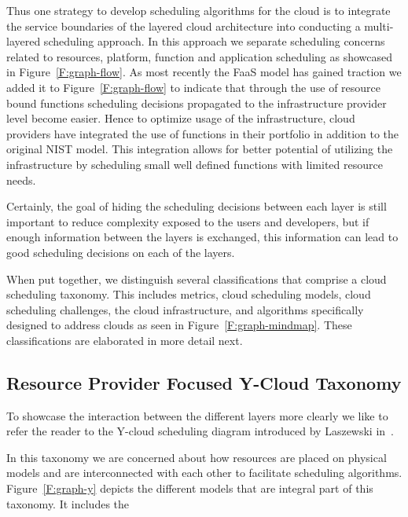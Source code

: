 \documentclass[final,5p,times,twocolumn]{elsarticle}
\begin{document}
Thus one strategy to develop scheduling algorithms for the cloud is to
integrate the service boundaries of the layered cloud architecture
into conducting a multi-layered scheduling approach. In this approach
we separate scheduling concerns related to resources, platform,
function and application scheduling as showcased in
Figure~\ref{F:graph-flow}.  As most recently the FaaS model has gained
traction we added it to Figure~\ref{F:graph-flow} to indicate that
through the use of resource bound functions scheduling decisions
propagated to the infrastructure provider level become easier.  Hence
to optimize usage of the infrastructure, cloud providers have
integrated the use of functions in their portfolio in addition to the
original NIST model.  This integration allows for better potential of
utilizing the infrastructure by scheduling small well defined
functions with limited resource needs.

Certainly, the goal of hiding the scheduling decisions between each
layer is still important to reduce complexity exposed to the users and
developers, but if enough information between the layers is exchanged,
this information can lead to good scheduling decisions on each of the
layers.

When put together, we distinguish several classifications that
comprise a cloud scheduling taxonomy. This includes
metrics, cloud scheduling models, cloud scheduling challenges, the
cloud infrastructure, and algorithms specifically designed to address
clouds as seen in Figure~\ref{F:graph-mindmap}.  These classifications are
elaborated in more detail next.



\subsection{Resource Provider Focused Y-Cloud Taxonomy}\label{sec:y}

To showcase the interaction between the different layers more clearly
we like to refer the reader to the Y-cloud scheduling diagram
introduced by Laszewski in~\cite{lasbook}.

In this taxonomy we are concerned about how resources are placed on
physical models and are interconnected with each other to facilitate
scheduling algorithms. Figure~\ref{F:graph-y} depicts the different
models that are integral part of this taxonomy. It includes the 
\end{document}
